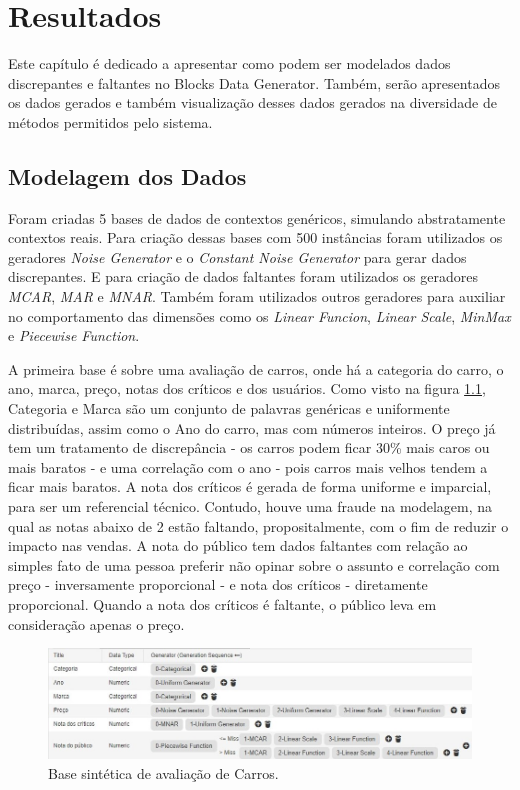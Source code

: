 \documentclass[
	12pt,				%
	openright,			%
	twoside,			%
	a4paper,			%
	english,			%
	brazil				%
	]{abntex2}
\begin{document}
\chapter{Resultados}
	Este capítulo é dedicado a apresentar como podem ser modelados dados discrepantes e faltantes no Blocks Data Generator.
	Também, serão apresentados os dados gerados e também visualização desses dados gerados na diversidade de métodos permitidos pelo sistema.
	\par
	
	\section{Modelagem dos Dados}

		Foram criadas 5 bases de dados de contextos genéricos, simulando abstratamente contextos reais.
		Para criação dessas bases com 500 instâncias foram utilizados os geradores
		 \emph{Noise Generator} e o \emph{Constant Noise Generator} para gerar dados discrepantes.
		E para criação de dados faltantes foram utilizados os geradores
		 \emph{MCAR}, \emph{MAR} e \emph{MNAR}.
		Também foram utilizados outros geradores para auxiliar no comportamento das dimensões como os
		 \emph{Linear Funcion}, \emph{Linear Scale}, \emph{MinMax} e 
		 \emph{Piecewise Function}.
		\par

		A primeira base é sobre uma avaliação de carros, onde há a categoria do carro, o ano, marca, preço, notas dos críticos e dos usuários.
		Como visto na figura \ref{fig:CarrosModelo}, Categoria e Marca são um conjunto de palavras genéricas e uniformente distribuídas, assim como o Ano do carro, mas com números inteiros.
		O preço já tem um tratamento de discrepância - os carros podem ficar 30\% mais caros ou mais baratos - e uma correlação com o ano - pois carros mais velhos tendem a ficar mais baratos.
		A nota dos críticos é gerada de forma uniforme e imparcial, para ser um referencial técnico.
		Contudo, houve uma fraude na modelagem, na qual as notas abaixo de 2 estão faltando, propositalmente, com o fim de reduzir o impacto nas vendas.
		A nota do público tem dados faltantes com relação ao simples fato de uma pessoa preferir não opinar sobre o assunto e correlação com preço - inversamente proporcional - e nota dos críticos - diretamente proporcional.
		Quando a nota dos críticos é faltante, o público leva em consideração apenas o preço.
		\par
		\begin{figure}[h!]
			\centering
			\includegraphics[width=\linewidth]{./figures/Resultados/CarrosModelo.jpg}
			\caption{Base sintética de avaliação de Carros.}
			\label{fig:CarrosModelo}
		\end{figure}
\end{document}

